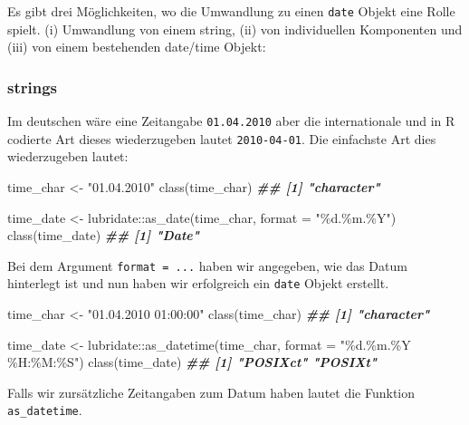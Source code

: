 \documentclass[
]{article}
\newenvironment{Shaded}{\begin{snugshade}}{\end{snugshade}}
\newcommand{\AttributeTok}[1]{\textcolor[rgb]{0.77,0.63,0.00}{#1}}
\newcommand{\DocumentationTok}[1]{\textcolor[rgb]{0.56,0.35,0.01}{\textbf{\textit{#1}}}}
\newcommand{\FunctionTok}[1]{\textcolor[rgb]{0.00,0.00,0.00}{#1}}
\newcommand{\NormalTok}[1]{#1}
\newcommand{\OtherTok}[1]{\textcolor[rgb]{0.56,0.35,0.01}{#1}}
\newcommand{\SpecialCharTok}[1]{\textcolor[rgb]{0.00,0.00,0.00}{#1}}
\newcommand{\StringTok}[1]{\textcolor[rgb]{0.31,0.60,0.02}{#1}}
\begin{document}
Es gibt drei Möglichkeiten, wo die Umwandlung zu einen \texttt{date} Objekt eine Rolle spielt. (i) Umwandlung von einem string, (ii) von individuellen Komponenten und (iii) von einem bestehenden date/time Objekt:

\hypertarget{strings}{%
\subsubsection{strings}\label{strings}}

Im deutschen wäre eine Zeitangabe \texttt{01.04.2010} aber die internationale und in R codierte Art dieses wiederzugeben lautet \texttt{2010-04-01}. Die einfachste Art dies wiederzugeben lautet:

\begin{Shaded}
\begin{Highlighting}[]
\NormalTok{time\_char }\OtherTok{\textless{}{-}} \StringTok{"01.04.2010"}
\FunctionTok{class}\NormalTok{(time\_char)}
\DocumentationTok{\#\# [1] "character"}

\NormalTok{time\_date }\OtherTok{\textless{}{-}}\NormalTok{ lubridate}\SpecialCharTok{::}\FunctionTok{as\_date}\NormalTok{(time\_char, }\AttributeTok{format =} \StringTok{"\%d.\%m.\%Y"}\NormalTok{)}
\FunctionTok{class}\NormalTok{(time\_date)}
\DocumentationTok{\#\# [1] "Date"}
\end{Highlighting}
\end{Shaded}

Bei dem Argument \texttt{format\ =\ ...} haben wir angegeben, wie das Datum hinterlegt ist und nun haben wir erfolgreich ein \texttt{date} Objekt erstellt.

\begin{Shaded}
\begin{Highlighting}[]
\NormalTok{time\_char }\OtherTok{\textless{}{-}} \StringTok{"01.04.2010 01:00:00"}
\FunctionTok{class}\NormalTok{(time\_char)}
\DocumentationTok{\#\# [1] "character"}

\NormalTok{time\_date }\OtherTok{\textless{}{-}}\NormalTok{ lubridate}\SpecialCharTok{::}\FunctionTok{as\_datetime}\NormalTok{(time\_char, }\AttributeTok{format =} \StringTok{"\%d.\%m.\%Y \%H:\%M:\%S"}\NormalTok{)}
\FunctionTok{class}\NormalTok{(time\_date)}
\DocumentationTok{\#\# [1] "POSIXct" "POSIXt"}
\end{Highlighting}
\end{Shaded}

Falls wir zursätzliche Zeitangaben zum Datum haben lautet die Funktion \texttt{as\_datetime}.
\end{document}
